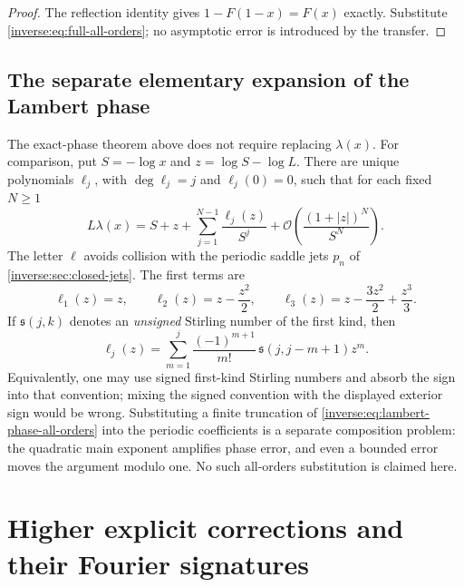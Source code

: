 \documentclass[11pt,oneside]{article}
\theoremstyle{definition}
\theoremstyle{remark}
\newcommand{\bigO}{\mathcal O}
\begin{document}
\begin{proof}
The reflection identity gives \(1-F(1-x)=F(x)\) exactly.  Substitute
\eqref{inverse:eq:full-all-orders}; no asymptotic error is introduced by the transfer.
\end{proof}

\subsection{The separate elementary expansion of the Lambert phase}

The exact-phase theorem above does not require replacing \(\lambda(x)\).  For comparison,
put \(S=-\log x\) and \(z=\log S-\log L\).  There are unique polynomials
\(\ell_j\), with \(\deg\ell_j=j\) and \(\ell_j(0)=0\), such that for each fixed
\(N\geq1\)
\begin{equation}
 L\lambda(x)=S+z+\sum_{j=1}^{N-1}\frac{\ell_j(z)}{S^j}
 +\bigO\!\left(\frac{(1+|z|)^N}{S^N}\right).
 \label{inverse:eq:lambert-phase-all-orders}
\end{equation}
The letter \(\ell\) avoids collision with the periodic saddle jets \(p_n\) of
\cref{inverse:sec:closed-jets}.  The first terms are
\[
 \ell_1(z)=z,\qquad
 \ell_2(z)=z-\frac{z^2}{2},\qquad
 \ell_3(z)=z-\frac{3z^2}{2}+\frac{z^3}{3}.
\]
If \(\mathfrak s(j,k)\) denotes an \emph{unsigned} Stirling number of the first kind, then
\begin{equation}
 \ell_j(z)=\sum_{m=1}^{j}
 \frac{(-1)^{m+1}}{m!}\,
 \mathfrak s(j,j-m+1)z^m.
 \label{inverse:eq:lambert-phase-stirling}
\end{equation}
Equivalently, one may use signed first-kind Stirling numbers and absorb the sign into that
convention; mixing the signed convention with the displayed exterior sign would be wrong.
Substituting a finite truncation of \eqref{inverse:eq:lambert-phase-all-orders} into the
periodic coefficients is a separate composition problem: the quadratic main exponent
amplifies phase error, and even a bounded error moves the argument modulo one.  No such
all-orders substitution is claimed here.

\section{Higher explicit corrections and their Fourier signatures}
\label{inverse:sec:higher-explicit}
\end{document}
